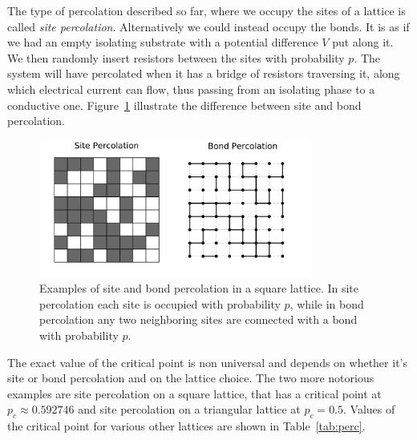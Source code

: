 The type of percolation described so far, where we occupy the sites of a lattice
is called \textit{site percolation}. Alternatively we could instead occupy the
bonds. It is as if we had an empty isolating substrate with a potential
difference $V$ put along it. We then randomly insert resistors between the
sites with probability $p$. The system will have percolated when it has a
bridge of resistors traversing it, along which electrical current can flow,
thus passing from an isolating phase to a conductive one.
Figure~\ref{fig:sitebond} illustrate the difference between site and bond
percolation.

\begin{figure}[b]
\begin{center}
    \includegraphics[width=0.8\textwidth]{chapters/ch2-crit/figs/sitebond}
\end{center}
\caption{Examples of site and bond percolation in a square lattice.
    In site percolation each site is occupied with probability $p$, while
    in bond percolation any two neighboring sites are connected with a bond
    with probability $p$.}
\label{fig:sitebond}
\end{figure}

The exact value of the critical point is non universal and depends on whether
it's site or bond percolation and on the lattice choice. The two more notorious
examples are site percolation on a square lattice, that has a critical point at
$p_c\approx0.592746$ and site percolation on a triangular lattice at $p_c=0.5$.
Values of the critical point for various other lattices are shown in
Table~\ref{tab:perc}.

